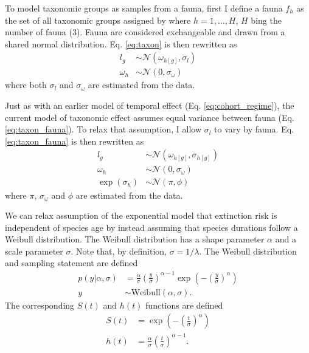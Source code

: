 \documentclass[12pt,letterpaper]{article}
\begin{document}
To model taxonomic groups as samples from a fauna, first I define a fauna \(f_{h}\) as the set of all taxonomic groups assigned by \citet{SepkoskiJr.1981a} where \(h = 1, \dots, H\), \(H\) bing the number of fauna (3). Fauna are considered exchangeable and drawn from a shared normal distribution. Eq. \ref{eq:taxon} is then rewritten as
\begin{equation}
  \begin{aligned}
    l_{g} &\sim \mathcal{N}(\omega_{h[g]}, \sigma_{l})\\
    \omega_{h} &\sim \mathcal{N}(0, \sigma_{\omega})
  \end{aligned}
  \label{eq:taxon_fauna}
\end{equation}
where both \(\sigma_{l}\) and \(\sigma_{\omega}\) are estimated from the data.

Just as with an earlier model of temporal effect (Eq. \ref{eq:cohort_regime}), the current model of taxonomic effect assumes equal variance between fauna (Eq. \ref{eq:taxon_fauna}). To relax that assumption, I allow \(\sigma_{l}\) to vary by fauna. Eq. \ref{eq:taxon_fauna} is then rewritten as
\begin{equation}
  \begin{aligned}
    l_{g} &\sim \mathcal{N}(\omega_{h[g]}, \sigma_{h[g]})\\
    \omega_{h} &\sim \mathcal{N}(0, \sigma_{\omega}) \\
    \exp(\sigma_{h}) &\sim \mathcal{N}(\pi, \phi)
  \end{aligned}
  \label{eq:taxon_complex}
\end{equation}
where \(\pi\), \(\sigma_{\omega}\) and \(\phi\) are estimated from the data.

We can relax assumption of the exponential model that extinction risk is independent of species age by instead assuming that species durations follow a Weibull distribution. The Weibull distribution has a shape parameter \(\alpha\) and a scale parameter \(\sigma\). Note that, by definition, \(\sigma = 1 / \lambda\). The Weibull distribution and sampling statement are defined
\begin{equation}
  \begin{aligned}
    p(y | \alpha, \sigma) &= \frac{\alpha}{\sigma} \left(\frac{y}{\sigma}\right)^{\alpha - 1} \exp\left(-\left(\frac{y}{\sigma}\right)^{\alpha}\right) \\
    y &\sim \mathrm{Weibull}(\alpha, \sigma).
  \end{aligned}
  \label{eq:weibull}
\end{equation}
The corresponding \(S(t)\) and \(h(t)\) functions are defined
\begin{align}
  S(t) &= \exp\left(-\left(\frac{t}{\sigma}\right)^{\alpha}\right) \label{eq:wei_surv} \\
  h(t) &= \frac{\alpha}{\sigma}\left(\frac{t}{\sigma}\right)^{\alpha - 1} \label{eq:wei_haz}.
\end{align}
\end{document}
